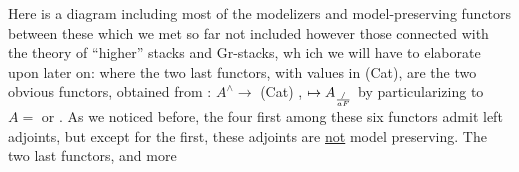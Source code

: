 Here is a diagram including most of the modelizers and model-preserving
functors between these which we met so far\hand{,}  \hand{(}not included however
those connected with the theory of ``higher'' stacks and Gr-stacks, wh ich we
will have to elaborate upon later on\hand{)}:
where the two last functors, with values in (Cat), are the two obvious
functors, obtained from
\hand{(**)} : $A^{\wedge}\to$ (Cat) ,  $\mapsto A_{/\over{a}{F}}$
by particularizing to $A=$\hand{$\Delta$} or \hand{$\square$}. As we noticed before, the four first
among these six functors admit left adjoints, but except for the first,
these adjoints are \uline{not} model preserving. The two last functors, and more
